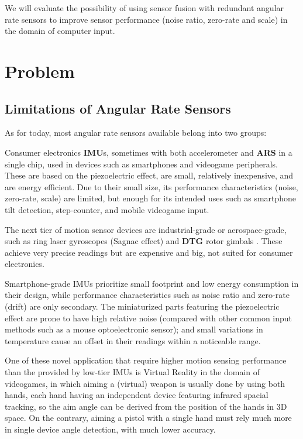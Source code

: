 \documentclass[10pt, twocolumn, a4paper]{article}
\begin{document}
    We will evaluate the possibility of using sensor fusion with redundant angular rate sensors to improve sensor performance (noise ratio, zero-rate and scale) in the domain of computer input.

\section{Problem}
    \subsection{Limitations of Angular Rate Sensors}
        As for today, most angular rate sensors available belong into two groups:

        Consumer electronics \textbf{IMU}s, sometimes with both accelerometer and {\textbf{ARS}} in a single chip, used in devices such as smartphones and videogame peripherals. These are based on the piezoelectric effect, are small, relatively inexpensive, and are energy efficient. Due to their small size, its performance characteristics (noise, zero-rate, scale) are limited, but enough for its intended uses such as smartphone tilt detection, step-counter, and mobile videogame input. \cite{piezo_mems}

        The next tier of motion sensor devices are industrial-grade or aerospace-grade, such as ring laser gyroscopes (Sagnac effect) and {\textbf{DTG}} rotor gimbals \cite{dtg}. These achieve very precise readings but are expensive and big, not suited for consumer electronics.

        Smartphone-grade IMUs prioritize small footprint and low energy consumption in their design, while performance characteristics such as noise ratio and zero-rate (drift) are only secondary. The miniaturized parts featuring the piezoelectric effect are prone to have high relative noise (compared with other common input methods such as a mouse optoelectronic sensor); and small variations in temperature cause an offset in their readings within a noticeable range.

        One of these novel application that require higher motion sensing performance than the provided by low-tier IMUs is Virtual Reality in the domain of videogames, in which aiming a (virtual) weapon is usually done by using both hands, each hand having an independent device featuring infrared spacial tracking, so the aim angle can be derived from the position of the hands in 3D space. On the contrary, aiming a pistol with a single hand must rely much more in single device angle detection, with much lower accuracy.
\end{document}
